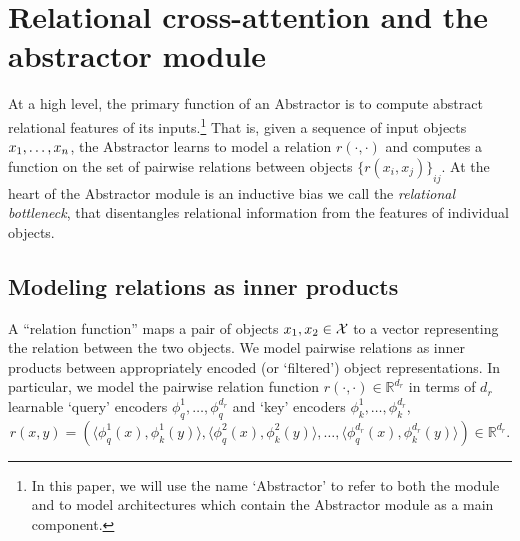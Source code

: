 \section{Relational cross-attention and the abstractor module}\label{sec:abstractor_module}

At a high level, the primary function of an Abstractor is to compute abstract relational features of its inputs.\footnote{In this paper, we will use the name `Abstractor' to refer to both the module and to model architectures which contain the Abstractor module as a main component.} That is, given a sequence of input objects $x_1, \ldots, x_n$, the Abstractor learns to model a relation $r(\cdot, \cdot)$ and computes a function on the set of pairwise relations between objects ${\{ r(x_i, x_j) \}}_{ij}$. At the heart of the Abstractor module is an inductive bias we call the \textit{relational bottleneck}, that disentangles relational information from the features of individual objects.

\subsection{Modeling relations as inner products}\label{ssec:relations_as_inner_prods}

A ``relation function'' maps a pair of objects $x_1, x_2 \in {\mathcal{X}}$ to a vector representing the relation between the two objects. We model pairwise relations as inner products between appropriately encoded (or `filtered') object representations. In particular, we model the pairwise relation function $r(\cdot, \cdot) \in \mathbb{R}^{d_r}$ in terms of $d_r$ learnable `query' encoders $\phi_q^{1}, \ldots, \phi_{q}^{d_r}$ and `key' encoders $\phi_k^{1}, \ldots, \phi_{k}^{d_r}$,
\begin{equation}\label{eq:inner_prod_rel}
    r(x, y) = \left(\langle \phi_q^{1}(x), \phi_k^{1}(y) \rangle, \langle \phi_q^{2}(x), \phi_k^{2}(y) \rangle, \ldots, \langle \phi_q^{d_r}(x), \phi_k^{d_r}(y) \rangle \right) \in \mathbb{R}^{d_r}.
\end{equation}


